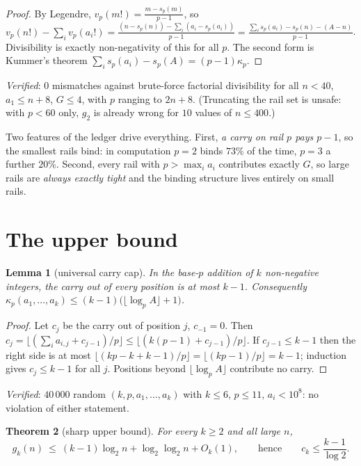 \documentclass[11pt]{article}
\newtheorem{theorem}{Theorem}
\newtheorem{lemma}[theorem]{Lemma}
\begin{document}
\begin{proof}
By Legendre, $v_p(m!)=\frac{m-s_p(m)}{p-1}$, so
$v_p(n!)-\sum_iv_p(a_i!)=\frac{(n-s_p(n))-\sum_i(a_i-s_p(a_i))}{p-1}
=\frac{\sum_is_p(a_i)-s_p(n)-(A-n)}{p-1}$.
Divisibility is exactly non-negativity of this for all $p$.  The second form is Kummer's
theorem $\sum_is_p(a_i)-s_p(A)=(p-1)\kappa_p$.
\end{proof}

\emph{Verified}: $0$ mismatches against brute-force factorial divisibility for all
$n<40$, $a_1\le n+8$, $G\le4$, with $p$ ranging to $2n+8$.  (Truncating the rail set is
unsafe: with $p<60$ only, $g_2$ is already wrong for $10$ values of $n\le400$.)

Two features of the ledger drive everything.  First, \emph{a carry on rail $p$ pays
$p-1$}, so the smallest rails bind: in computation $p=2$ binds $73\%$ of the time, $p=3$
a further $20\%$.  Second, every rail with $p>\max_i a_i$ contributes exactly $G$, so
large rails are \emph{always exactly tight} and the binding structure lives entirely on
small rails.

\section{The upper bound}

\begin{lemma}[universal carry cap]\label{lem:cap}
In the base-$p$ addition of $k$ non-negative integers, the carry out of every position is
at most $k-1$.  Consequently
$\kappa_p(a_1,\dots,a_k)\le(k-1)\bigl(\lfloor\log_pA\rfloor+1\bigr)$.
\end{lemma}

\begin{proof}
Let $c_j$ be the carry out of position $j$, $c_{-1}=0$.  Then
$c_j=\bigl\lfloor(\sum_i a_{i,j}+c_{j-1})/p\bigr\rfloor
\le\bigl\lfloor(k(p-1)+c_{j-1})/p\bigr\rfloor$.
If $c_{j-1}\le k-1$ then the right side is at most
$\lfloor(kp-k+k-1)/p\rfloor=\lfloor(kp-1)/p\rfloor=k-1$; induction gives $c_j\le k-1$ for
all $j$.  Positions beyond $\lfloor\log_pA\rfloor$ contribute no carry.
\end{proof}

\emph{Verified}: $40\,000$ random $(k,p,a_1,\dots,a_k)$ with $k\le6$, $p\le11$,
$a_i<10^8$: no violation of either statement.

\begin{theorem}[sharp upper bound]\label{thm:upper}
For every $k\ge2$ and all large $n$,
\[
  g_k(n)\ \le\ (k-1)\log_2 n+\log_2\log_2 n+O_k(1),
  \qquad\text{hence}\qquad
  c_k\le\frac{k-1}{\log 2}.
\]
\end{theorem}
\end{document}
